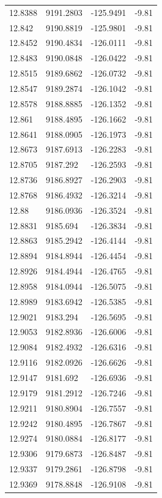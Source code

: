 \begin{table}[H]
\begin{tabular}{llll}
12.8388 & 9191.2803 & -125.9491 & -9.81 \\
12.842 & 9190.8819 & -125.9801 & -9.81 \\
12.8452 & 9190.4834 & -126.0111 & -9.81 \\
12.8483 & 9190.0848 & -126.0422 & -9.81 \\
12.8515 & 9189.6862 & -126.0732 & -9.81 \\
12.8547 & 9189.2874 & -126.1042 & -9.81 \\
12.8578 & 9188.8885 & -126.1352 & -9.81 \\
12.861 & 9188.4895 & -126.1662 & -9.81 \\
12.8641 & 9188.0905 & -126.1973 & -9.81 \\
12.8673 & 9187.6913 & -126.2283 & -9.81 \\
12.8705 & 9187.292 & -126.2593 & -9.81 \\
12.8736 & 9186.8927 & -126.2903 & -9.81 \\
12.8768 & 9186.4932 & -126.3214 & -9.81 \\
12.88 & 9186.0936 & -126.3524 & -9.81 \\
12.8831 & 9185.694 & -126.3834 & -9.81 \\
12.8863 & 9185.2942 & -126.4144 & -9.81 \\
12.8894 & 9184.8944 & -126.4454 & -9.81 \\
12.8926 & 9184.4944 & -126.4765 & -9.81 \\
12.8958 & 9184.0944 & -126.5075 & -9.81 \\
12.8989 & 9183.6942 & -126.5385 & -9.81 \\
12.9021 & 9183.294 & -126.5695 & -9.81 \\
12.9053 & 9182.8936 & -126.6006 & -9.81 \\
12.9084 & 9182.4932 & -126.6316 & -9.81 \\
12.9116 & 9182.0926 & -126.6626 & -9.81 \\
12.9147 & 9181.692 & -126.6936 & -9.81 \\
12.9179 & 9181.2912 & -126.7246 & -9.81 \\
12.9211 & 9180.8904 & -126.7557 & -9.81 \\
12.9242 & 9180.4895 & -126.7867 & -9.81 \\
12.9274 & 9180.0884 & -126.8177 & -9.81 \\
12.9306 & 9179.6873 & -126.8487 & -9.81 \\
12.9337 & 9179.2861 & -126.8798 & -9.81 \\
12.9369 & 9178.8848 & -126.9108 & -9.81 \\

\end{tabular}
\end{table}
